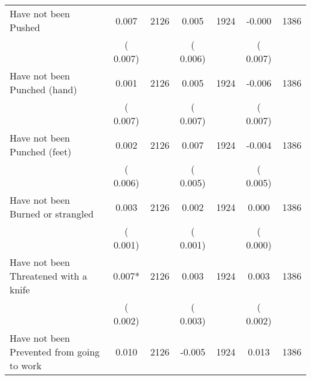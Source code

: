 \begin{tabular}{l*{6}{c}}
Have not been Pushed        &              0.007      &       2126       &              0.005      &       1924       &             -0.000      &       1386       \\
                       &       (       0.007)            &                               &       (       0.006)            &                               &       (       0.007)            &                               \\
Have not been Punched (hand)        &              0.001      &       2126       &              0.005      &       1924       &             -0.006      &       1386       \\
                       &       (       0.007)            &                               &       (       0.007)            &                               &       (       0.007)            &                               \\
Have not been Punched (feet)        &              0.002      &       2126       &              0.007      &       1924       &             -0.004      &       1386       \\
                       &       (       0.006)            &                               &       (       0.005)            &                               &       (       0.005)            &                               \\
Have not been Burned or strangled        &              0.003      &       2126       &              0.002      &       1924       &              0.000      &       1386       \\
                       &       (       0.001)            &                               &       (       0.001)            &                               &       (       0.000)            &                               \\
Have not been Threatened with a knife        &              0.007*      &       2126       &              0.003      &       1924       &              0.003      &       1386       \\
                       &       (       0.002)            &                               &       (       0.003)            &                               &       (       0.002)            &                               \\
Have not been Prevented from going to work        &              0.010      &       2126       &             -0.005      &       1924       &              0.013      &       1386       \\

\end{tabular}
